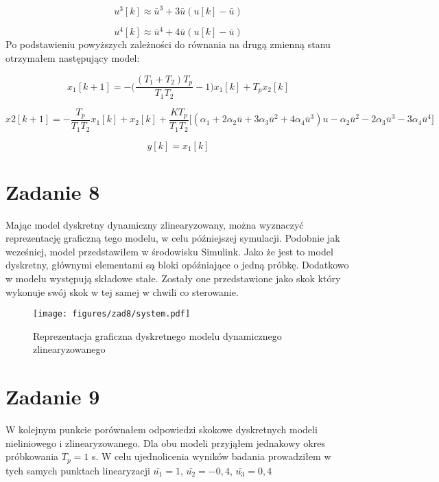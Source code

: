 \documentclass[a4paper,titlepage,11pt,floatssmall]{mwrep}
\begin{document}
\begin{equation*}
u^3[k] \approx \bar{u}^3  + 3\bar{u}(u[k] - \bar{u})
\end{equation*}

\begin{equation*}
u^4[k] \approx \bar{u}^4 + 4\bar{u}(u[k] - \bar{u})
\end{equation*}
\newpage
Po podstawieniu powyższych zależności do równania na drugą zmienną stanu otrzymałem następujący model:

\begin{equation*}
x_1[k+1] = -\bigg(\frac{(T_1 + T_2)T_p}{T_1 T_2} - 1\bigg)x_1[k] + T_p x_2[k] 
\end{equation*}

\begin{equation*} 
x2[k+1] = -\frac{T_p}{T_1 T_2}x_1[k] + x_2[k] + \frac{K T_p}{T_1 T_2}\bigg[ (\alpha_1 + 2\alpha_2\bar{u} + 3\alpha_3\bar{u}^2 + 4\alpha_4\bar{u}^3)u - \alpha_2\bar{u}^2 - 2\alpha_3\bar{u}^3 - 3\alpha_4\bar{u}^4\bigg] 
\end{equation*}

\begin{equation*}
y[k] = x_1[k]
\end{equation*}

\section{Zadanie 8}
Mając model dyskretny dynamiczny zlinearyzowany, można wyznaczyć reprezentację graficzną tego modelu, w celu późniejszej symulacji. Podobnie jak wcześniej, model przedstawiłem w środowisku Simulink. Jako że jest to model dyskretny, głównymi elementami są bloki opóźniające o jedną próbkę. Dodatkowo w modelu występują składowe stałe. Zostały one przedstawione jako skok  który wykonuje swój skok w tej samej w chwili co sterowanie.

\begin{figure}[H]
\centering
\texttt{[image: figures/zad8/system.pdf]}
\caption{Reprezentacja graficzna dyskretnego modelu dynamicznego zlinearyzowanego}
\end{figure}

\newpage
\section{Zadanie 9}
\indent{} W kolejnym punkcie porównałem odpowiedzi skokowe dyskretnych modeli nieliniowego i zlinearyzowanego. Dla obu modeli przyjąłem jednakowy okres próbkowania $T_p = 1$ s. W celu ujednolicenia wyników badania prowadziłem w tych samych punktach linearyzacji $\bar{u_1} = 1$, $\bar{u_2} = -0,4$, $\bar{u_3} = 0,4$ 
\\ \\
\bigskip
\end{document}
